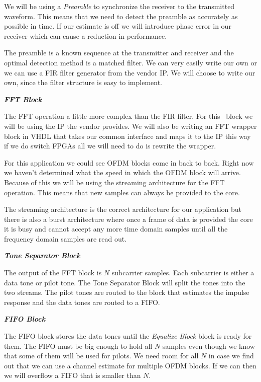 We will be using a \emph{Preamble} to synchronize the receiver to the transmitted waveform. This means that we need to detect the preamble as accurately as possible in time. If our estimate is off we will introduce phase error in our receiver which can cause a reduction in performance.

The preamble is a known sequence at the transmitter and receiver and the optimal detection method is a matched filter. We can very easily write our own or we can use a \ac{FIR} filter generator from the vendor \ac{IP}. We will choose to write our own, since the filter structure is easy to implement.

{\bf \emph{\ac{FFT} Block}}

The \ac{FFT} operation a little more complex than the \ac{FIR} filter. For this  block we will be using the \ac{IP} the vendor provides. We will also be writing an \ac{FFT} wrapper block in \ac{VHDL} that takes our common interface and maps it to the \ac{IP} this way if we do switch \ac{FPGA}s all we will need to do is rewrite the wrapper.

For this application we could see \ac{OFDM} blocks come in back to back. Right now we haven't determined what the speed in which the \ac{OFDM} block will arrive. Because of this we will be using the streaming architecture for the \ac{FFT} operation. This means that new samples can always be provided to the core.

The streaming architecture is the correct architecture for our application but there is also a burst architecture where once a frame of data is provided the core it is busy and cannot accept any more time domain samples until all the frequency domain samples are read out.

{\bf \emph{Tone Separator Block}}

The output of the \ac{FFT} block is $N$ subcarrier samples. Each subcarrier is either a data tone or pilot tone. The Tone Separator Block will split the tones into the two streams. The pilot tones are routed to the block that estimates the impulse response and the data tones are routed to a \ac{FIFO}.

{\bf \emph{\ac{FIFO} Block}}

The \ac{FIFO} block stores the data tones until the \emph{Equalize Block} block is ready for them. The \ac{FIFO} must be big enough to hold all $N$ samples even though we know that some of them will be used for pilots. We need room for all $N$ in case we find out that we can use a channel estimate for multiple \ac{OFDM} blocks. If we can then we will overflow a \ac{FIFO} that is smaller than $N$.

